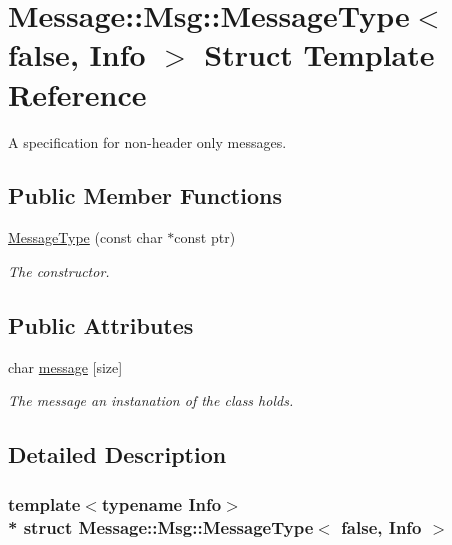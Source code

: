 \hypertarget{struct_message_1_1_msg_1_1_message_type_3_01false_00_01_info_01_4}{}\section{Message\+:\+:Msg\+:\+:Message\+Type$<$ false, Info $>$ Struct Template Reference}
\label{struct_message_1_1_msg_1_1_message_type_3_01false_00_01_info_01_4}


A specification for non-\/header only messages.  


\subsection*{Public Member Functions}
\begin{DoxyCompactItemize}
\item 
\hyperlink{struct_message_1_1_msg_1_1_message_type_3_01false_00_01_info_01_4_a81f148929319c2b03cc46779af945bfb}{Message\+Type} (const char $\ast$const ptr)
\begin{DoxyCompactList}\small\item\em The constructor. \end{DoxyCompactList}\end{DoxyCompactItemize}
\subsection*{Public Attributes}
\begin{DoxyCompactItemize}
\item 
char \hyperlink{struct_message_1_1_msg_1_1_message_type_3_01false_00_01_info_01_4_a285ad1635e73a096386e61fc965a6038}{message} \mbox{[}size\mbox{]}
\begin{DoxyCompactList}\small\item\em The message an instanation of the class holds. \end{DoxyCompactList}\end{DoxyCompactItemize}


\subsection{Detailed Description}
\subsubsection*{template$<$typename Info$>$\\*
struct Message\+::\+Msg\+::\+Message\+Type$<$ false, Info $>$}

